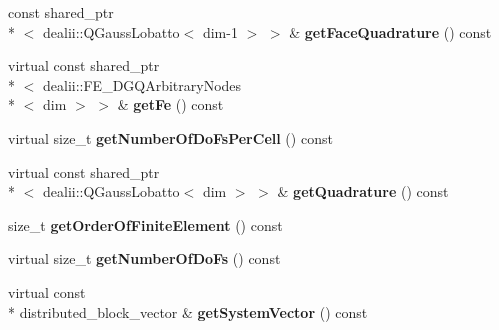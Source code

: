 \begin{DoxyCompactItemize}
\item 
\hypertarget{classnatrium_1_1SEDGMinLee_a653928dc9f0dd3715389b28196cab7bb}{const shared\-\_\-ptr\\*
$<$ dealii\-::\-Q\-Gauss\-Lobatto$<$ dim-\/1 $>$ $>$ \& {\bfseries get\-Face\-Quadrature} () const }\label{classnatrium_1_1SEDGMinLee_a653928dc9f0dd3715389b28196cab7bb}

\item 
\hypertarget{classnatrium_1_1SEDGMinLee_a7fd488e872e5cf9870be39f07a2dcd74}{virtual const shared\-\_\-ptr\\*
$<$ dealii\-::\-F\-E\-\_\-\-D\-G\-Q\-Arbitrary\-Nodes\\*
$<$ dim $>$ $>$ \& {\bfseries get\-Fe} () const }\label{classnatrium_1_1SEDGMinLee_a7fd488e872e5cf9870be39f07a2dcd74}

\item 
\hypertarget{classnatrium_1_1SEDGMinLee_a5dac839ef4963af315dba5f201bd763c}{virtual size\-\_\-t {\bfseries get\-Number\-Of\-Do\-Fs\-Per\-Cell} () const }\label{classnatrium_1_1SEDGMinLee_a5dac839ef4963af315dba5f201bd763c}

\item 
\hypertarget{classnatrium_1_1SEDGMinLee_a4db0d2b4c857962d5425f755be3daf13}{virtual const shared\-\_\-ptr\\*
$<$ dealii\-::\-Q\-Gauss\-Lobatto$<$ dim $>$ $>$ \& {\bfseries get\-Quadrature} () const }\label{classnatrium_1_1SEDGMinLee_a4db0d2b4c857962d5425f755be3daf13}

\item 
\hypertarget{classnatrium_1_1SEDGMinLee_a745a65de3ee72a250c0706e6c7fcc361}{size\-\_\-t {\bfseries get\-Order\-Of\-Finite\-Element} () const }\label{classnatrium_1_1SEDGMinLee_a745a65de3ee72a250c0706e6c7fcc361}

\item 
\hypertarget{classnatrium_1_1SEDGMinLee_af667cda1a894340f614da67c0a0ae5da}{virtual size\-\_\-t {\bfseries get\-Number\-Of\-Do\-Fs} () const }\label{classnatrium_1_1SEDGMinLee_af667cda1a894340f614da67c0a0ae5da}

\item 
\hypertarget{classnatrium_1_1SEDGMinLee_ac4d17489cf8bf5e98bd7bd4e3e32f0d4}{virtual const \\*
distributed\-\_\-block\-\_\-vector \& {\bfseries get\-System\-Vector} () const }\label{classnatrium_1_1SEDGMinLee_ac4d17489cf8bf5e98bd7bd4e3e32f0d4}

\end{DoxyCompactItemize}


